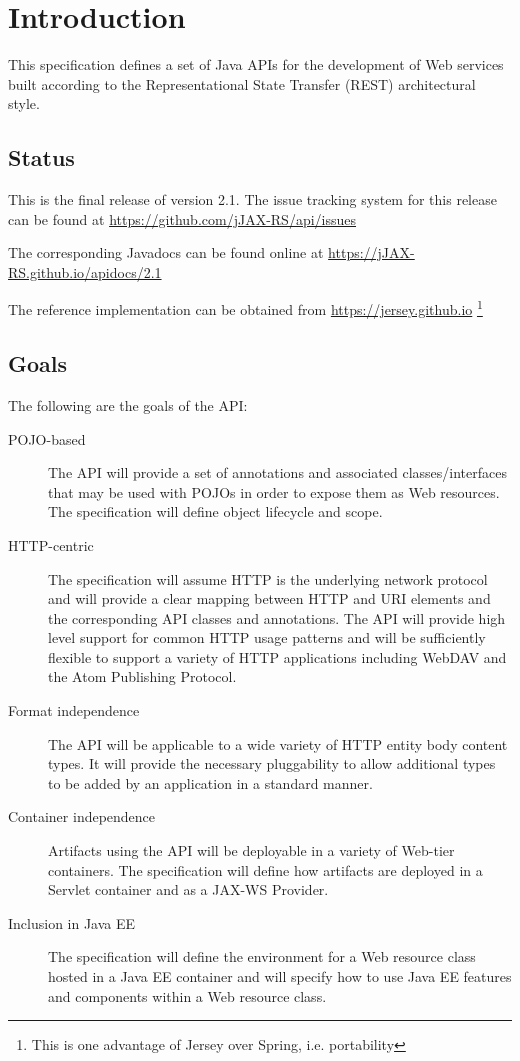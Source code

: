\chapter{Introduction}

This specification defines a set of Java APIs for the development of Web services built according to the
Representational State Transfer (REST) architectural style.

\section{Status}
\label{status}

This is the final release of version 2.1. The issue tracking system for this release can be found at
\url{https://github.com/jJAX-RS/api/issues}

The corresponding Javadocs can be found online at \url{https://jJAX-RS.github.io/apidocs/2.1}

\textcolor{highlight green}{The reference implementation can be obtained from \url{https://jersey.github.io}}
\footnote{This is one advantage of Jersey over Spring, i.e. portability}

\section{Goals}

The following are the goals of the API:

\begin{description}
    \item[POJO-based] The API will provide a set of annotations and associated classes/interfaces that may be used with
    POJOs in order to expose them as Web resources. The specification will define object lifecycle and scope.
    \item[HTTP-centric] The specification will assume HTTP is the underlying network protocol and will provide a clear
    mapping between HTTP and URI elements and the corresponding API classes and annotations. The API will provide high
    level support for common HTTP usage patterns and will be sufficiently flexible to support a variety of HTTP
    applications including WebDAV and the Atom Publishing Protocol.
    \item[Format independence] The API will be applicable to a wide variety of HTTP entity body content types. It will
    provide the necessary pluggability to allow additional types to be added by an application in a standard manner.
    \item[Container independence] Artifacts using the API will be deployable in a variety of Web-tier containers. The
    specification will define how artifacts are deployed in a Servlet container and as a JAX-WS Provider.
    \item[Inclusion in Java EE] The specification will define the environment for a Web resource class hosted in a Java
    EE container and will specify how to use Java EE features and components within a Web resource class.
\end{description}

